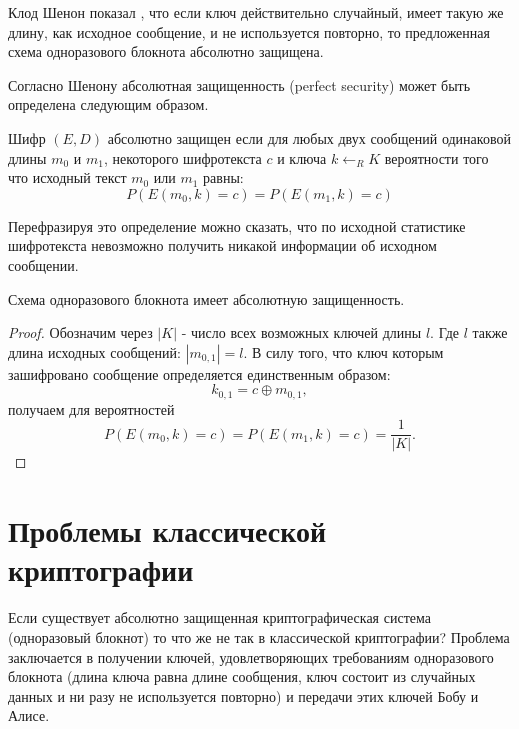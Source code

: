 Клод Шенон показал \cite{bShenonCrypto}, что если ключ действительно
случайный, имеет такую 
же длину, как исходное сообщение, и не используется повторно, то
предложенная 
схема одноразового блокнота абсолютно защищена.

Согласно Шенону абсолютная защищенность (perfect security) может быть
определена следующим образом.
\begin{definition}
Шифр $\left(E, D\right)$ абсолютно защищен если для любых двух
сообщений одинаковой длины $m_0$ и $m_1$, некоторого шифротекста $c$ и
ключа $k \leftarrow_R K$ вероятности того что исходный текст $m_0$ или
$m_1$ равны:
\begin{equation}
P\left(E\left(m_0, k\right) = c \right) = 
P\left(E\left(m_1, k\right) = c \right)
\nonumber
\end{equation}
\end{definition}
Перефразируя это определение можно сказать, что по исходной статистике
шифротекста невозможно получить никакой информации об исходном
сообщении. 

\begin{theorem}
Схема одноразового блокнота имеет абсолютную защищенность.
\end{theorem}

\begin{proof}
Обозначим через $\left|K\right|$ - число всех возможных ключей длины
$l$. Где $l$ также длина исходных сообщений: $\left|m_{0,1}\right| =
l$. В силу того, что ключ которым зашифровано сообщение определяется
единственным образом:
\begin{equation}
k_{0,1} = c \oplus m_{0,1},
\nonumber
\end{equation} 
получаем для вероятностей
\begin{equation}
P\left(E\left(m_0, k\right) = c \right) = 
P\left(E\left(m_1, k\right) = c \right) = 
\frac{1}{\left|K\right|}.
\nonumber
\end{equation}
\end{proof}

\section{Проблемы классической криптографии}

Если существует абсолютно защищенная криптографическая система (одноразовый блокнот) то
что же не так в классической криптографии? Проблема заключается в
получении ключей, удовлетворяющих требованиям одноразового блокнота
(длина ключа равна длине сообщения, ключ состоит из случайных данных и
ни разу не используется повторно) и передачи этих ключей Бобу и Алисе.

